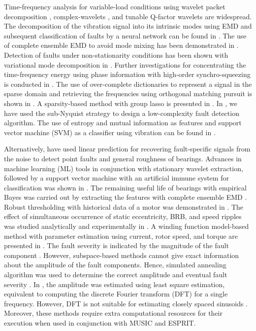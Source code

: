 Time-frequency analysis for variable-load conditions using wavelet packet decomposition \cite{Teotrakool2009}, complex-wavelets \cite{Seshadrinath2014}, and tunable Q-factor wavelets \cite{he2015automatic} are widespread. The decomposition of the vibration signal into its intrinsic modes using EMD and subsequent classification of faults by a neural network can be found in \cite{saucedo2016multifault}. The use of complete ensemble EMD to avoid mode mixing has been demonstrated in \cite{delgado2017methodology}. Detection of faults under non-stationarity conditions has been shown with variational mode decomposition in \cite{yan2019application}. Further investigations for concentrating the time-frequency energy using phase information with high-order synchro-squeezing is conducted in \cite{tu2019demodulated}. The use of over-complete dictionaries to represent a signal in the sparse domain and retrieving the frequencies using orthogonal matching pursuit is shown in \cite{morales2018incipient}. A sparsity-based method with group lasso is presented in \cite{zhao2019enhanced}. In \cite{naha2017low}, we have used the sub-Nyquist strategy to design a low-complexity fault detection algorithm. The use of entropy and mutual information as features and support vector machine (SVM) as a classifier using vibration can be found in \cite{pan2016fault}. 

Alternatively, \cite{dalvand2018detection} have used linear prediction for recovering fault-specific signals from the noise to detect point faults and general roughness of bearings. Advances in machine learning (ML) tools in conjunction with stationary wavelet extraction, followed by a support vector machine with an artificial immune system for classification was shown in \cite{abid2018distinct}. The remaining useful life of bearings with empirical Bayes was carried out by extracting the features with complete ensemble EMD \cite{wu2019degradation}. Robust thresholding with historical data of a motor was demonstrated in \cite{schmidt2019open}. The effect of simultaneous occurrence of static eccentricity, BRB, and speed ripples was studied analytically and experimentally in \cite{Kaikaa2014}. A winding function model-based method with parameter estimation using current, rotor speed, and torque are presented in \cite{Shi2014new}. The fault severity is indicated by the magnitude of the fault component \cite{Bellini2001, Xu2010}. However, subspace-based methods cannot give exact information about the amplitude of the fault components. Hence, simulated annealing algorithm was used to determine the correct amplitude and eventual fault severity \cite{Xu2012a}. In \cite{Kim2013, Trachi2016}, the amplitude was estimated using least square estimation, equivalent to computing the discrete Fourier transform (DFT) for a single frequency. However, DFT is not suitable for estimating closely spaced sinusoids \cite{Halder1997, Stoica2000}. Moreover, these methods require extra computational resources for their execution when used in conjunction with MUSIC and ESPRIT.

